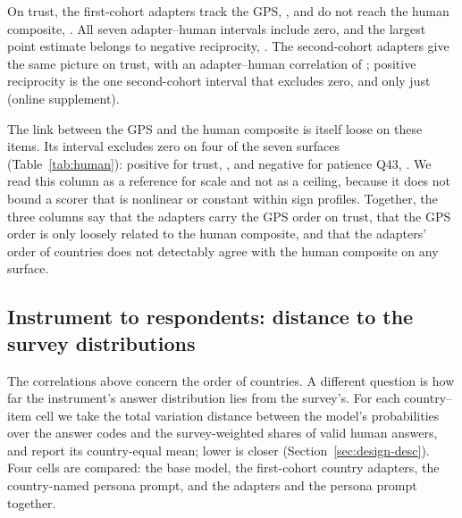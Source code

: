 On trust, the first-cohort adapters track the GPS,  , and do not reach the human composite,  . All seven adapter--human intervals include zero, and the largest point estimate belongs to negative reciprocity,  . The second-cohort adapters give the same picture on trust, with an adapter--human correlation of  ; positive reciprocity is the one second-cohort interval that excludes zero, and only just (online supplement).

The link between the GPS and the human composite is itself loose on these items. Its interval excludes zero on four of the seven surfaces (Table~\ref{tab:human}): positive for trust,  , and negative for patience Q43,  . We read this column as a reference for scale and not as a ceiling, because it does not bound a scorer that is nonlinear or constant within sign profiles. Together, the three columns say that the adapters carry the GPS order on trust, that the GPS order is only loosely related to the human composite, and that the adapters' order of countries does not detectably agree with the human composite on any surface.



\subsection{Instrument to respondents: distance to the survey distributions}\label{sec:res-tvd}

The correlations above concern the order of countries. A different question is how far the instrument's answer distribution lies from the survey's. For each country--item cell we take the total variation distance between the model's probabilities over the answer codes and the survey-weighted shares of valid human answers, and report its country-equal mean; lower is closer (Section~\ref{sec:design-desc}). Four cells are compared: the base model, the first-cohort country adapters, the country-named persona prompt, and the adapters and the persona prompt together.

